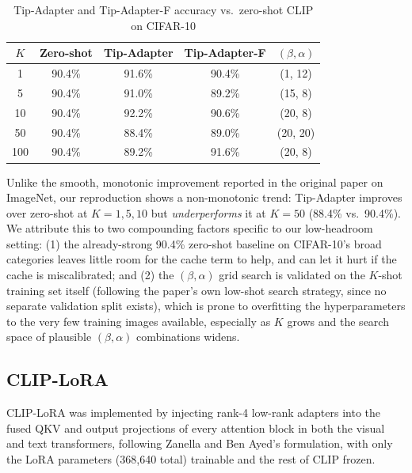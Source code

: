 \documentclass{iutbscthesis}
\begin{document}
\begin{table}[H]
    \centering
    \begin{tabular}{c c c c c}
        \toprule
        \textbf{$K$} & \textbf{Zero-shot} & \textbf{Tip-Adapter} & \textbf{Tip-Adapter-F} & \textbf{$(\beta, \alpha)$} \\
        \midrule
        1   & 90.4\% & 91.6\% & 90.4\% & (1, 12) \\
        5   & 90.4\% & 91.0\% & 89.2\% & (15, 8) \\
        10  & 90.4\% & 92.2\% & 90.6\% & (20, 8) \\
        50  & 90.4\% & 88.4\% & 89.0\% & (20, 20) \\
        100 & 90.4\% & 89.2\% & 91.6\% & (20, 8) \\
        \bottomrule
    \end{tabular}
    \caption{Tip-Adapter and Tip-Adapter-F accuracy vs.\ zero-shot CLIP on CIFAR-10}
    \label{tab:tipadapter}
\end{table}

Unlike the smooth, monotonic improvement reported in the original paper on ImageNet, our reproduction shows a non-monotonic trend: Tip-Adapter improves over zero-shot at $K=1,5,10$ but \emph{underperforms} it at $K=50$ (88.4\% vs.\ 90.4\%). We attribute this to two compounding factors specific to our low-headroom setting: (1) the already-strong 90.4\% zero-shot baseline on CIFAR-10's broad categories leaves little room for the cache term to help, and can let it hurt if the cache is miscalibrated; and (2) the $(\beta,\alpha)$ grid search is validated on the $K$-shot training set itself (following the paper's own low-shot search strategy, since no separate validation split exists), which is prone to overfitting the hyperparameters to the very few training images available, especially as $K$ grows and the search space of plausible $(\beta,\alpha)$ combinations widens.

\subsection{CLIP-LoRA}

CLIP-LoRA \cite{zanella2024cliplora} was implemented by injecting rank-4 low-rank adapters into the fused QKV and output projections of every attention block in both the visual and text transformers, following Zanella and Ben Ayed's formulation, with only the LoRA parameters (368{,}640 total) trainable and the rest of CLIP frozen.
\end{document}
